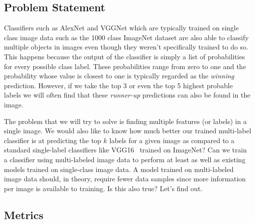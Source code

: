 \documentclass[12pt,journal,compsoc]{IEEEtran}
\begin{document}
\subsection{Problem Statement}




Classifiers such as AlexNet and VGGNet which are typically trained on single class image data such as the 1000 class ImageNet dataset are also able to classify multiple objects in images even though they weren't specifically trained to do so. This happens because the output of the classifier is simply a list of probabilities for every possible class label.  These probabilities range from zero to one and the probability whose value is closest to one is typically regarded as the \textit{winning} prediction.  However, if we take the top 3 or even the top 5 highest probable labels we will often find that these \textit{runner-up} predictions can also be found in the image.  

The problem that we will try to solve is finding multiple features (or labels) in a single image. We would also like to know how much better our trained multi-label classifier is at predicting the top $k$ labels for a given image as compared to a standard single-label classifiers like VGG16~\cite{SimonyanZ14a} trained on ImageNet? Can we train a classifier using multi-labeled image data to perform at least as well as existing models trained on single-class image data.  A model trained on multi-labeled image data should, in theory, require fewer data samples since more information per image is available to training. Is this also true?  Let's find out.


\subsection{Metrics}\label{sec:metrics}
\end{document}
